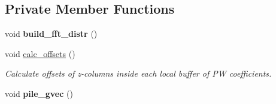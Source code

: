 \subsection*{Private Member Functions}
\begin{DoxyCompactItemize}
\item 
\hypertarget{classsddk_1_1_gvec__partition_a4803538e00b92bbfc940a23deaa85f7e}{}void {\bfseries build\+\_\+fft\+\_\+distr} ()\label{classsddk_1_1_gvec__partition_a4803538e00b92bbfc940a23deaa85f7e}

\item 
void \hyperlink{classsddk_1_1_gvec__partition_a1eea4c78b08ef2467324140d1a4044ce}{calc\+\_\+offsets} ()
\begin{DoxyCompactList}\small\item\em Calculate offsets of z-\/columns inside each local buffer of P\+W coefficients. \end{DoxyCompactList}\item 
\hypertarget{classsddk_1_1_gvec__partition_a8cf19cbdd18899f96a58d79dc8b71894}{}void {\bfseries pile\+\_\+gvec} ()\label{classsddk_1_1_gvec__partition_a8cf19cbdd18899f96a58d79dc8b71894}

\end{DoxyCompactItemize}
